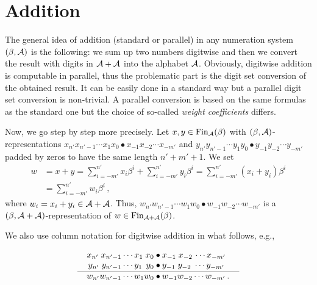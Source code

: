 \section{Addition}
\label{sec:addition}
The general idea of addition (standard or parallel) in any numeration system $(\beta,\mathcal{A})$ is the following: we sum up two numbers digitwise and then we convert the result with digits in $\mathcal{A}+\mathcal{A}$ into the alphabet $\mathcal{A}$. Obviously, digitwise addition is computable in parallel, thus the problematic part is the digit set conversion of the obtained result. It can be easily done in a standard way but a parallel digit set conversion is non-trivial. A parallel conversion is based on the same  formulas as the standard one but the choice of so-called \emph{weight coefficients} differs.

Now, we go step by step more precisely. Let $x,y \in \text{Fin}_{\mathcal{A}}(\beta)$ with $(\beta,\mathcal{A})$-representations $x_{n'}x_{{n'}-1}\cdots x_1 x_0\bullet x_{-1} x_{-2} \cdots x_{-m'}$ and $y_{n'}y_{{n'}-1}\cdots y_1 y_0\bullet y_{-1} y_{-2} \cdots y_{-m'}$ padded by zeros to have the same length $n'+m'+1$. We set 
  \begin{align*}
    w&=x+y =\sum_{i=-m'}^{n'} x_i\beta^i + \sum_{i=-m'}^{n'} y_i\beta^i = \sum_{i=-m'}^{n'} (x_i+y_i)\beta^i \\
    &=\sum_{i=-m'}^{n'} w_i\beta^i \,,
  \end{align*}
  where $w_i=x_i+y_i \in \mathcal{A} +\mathcal{A}$. Thus, $w_{n'} w_{{n'}-1}\cdots w_1 w_0 \bullet w_{-1} w_{-2} \cdots w_{-m'}$ is a  $(\beta, \mathcal{A}+\mathcal{A})$-representation of $w\in \text{Fin}_{\mathcal{A}+\mathcal{A}}(\beta)$. 

We also use column notation for digitwise addition in what follows, e.g.,    
 
  \begin{align*}
  x_{n'} \;x_{{n'}-1}\cdots x_1 \;x_0 &\bullet x_{-1} \;x_{-2}\, \cdots x_{-m'} \\[-3pt]
  y_{n'} \;y_{{n'}-1}\cdots y_1 \,\;y_0 &\bullet y_{-1} \;y_{-2} \;\cdots y_{-m'} \\[-10pt]
    \line(1,0){90} & \line(1,0){100} \\[-7pt]
  w_{n'} w_{{n'}-1}\cdots w_1 w_0 &\bullet w_{-1} w_{-2} \cdots w_{-m'}\,.
  \end{align*}
  

